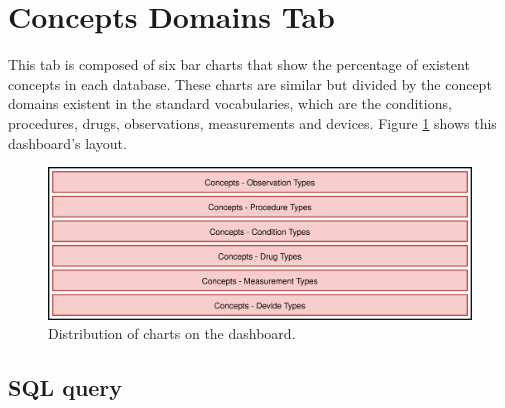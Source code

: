 \documentclass[]{book}
\begin{document}
\section{Concepts Domains Tab}\label{concepts-domains-tab}

This tab is composed of six bar charts that show the percentage of
existent concepts in each database. These charts are similar but divided
by the concept domains existent in the standard vocabularies, which are
the conditions, procedures, drugs, observations, measurements and
devices. Figure \ref{fig:conceptsDomainsLayout} shows this dashboard's
layout.

\begin{figure}
\includegraphics[width=1\linewidth]{images/conceptsDomainsLayout} \caption{Distribution of charts on the dashboard.}\label{fig:conceptsDomainsLayout}
\end{figure}

\subsection{SQL query}\label{sql-query-17}
\end{document}
